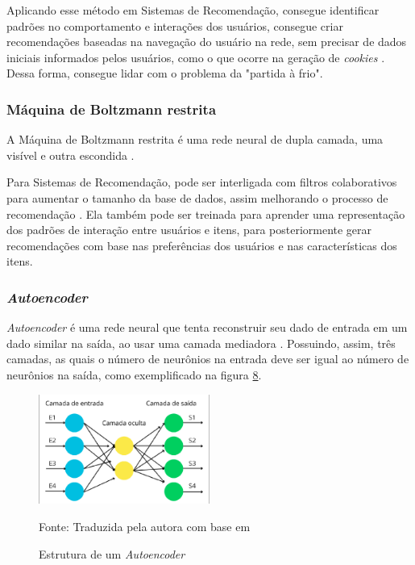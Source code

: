 Aplicando esse método em Sistemas de Recomendação, consegue identificar padrões no comportamento e interações dos usuários,
consegue criar recomendações baseadas na navegação do usuário na rede, sem precisar de dados iniciais informados pelos
usuários, como o que ocorre na geração de \textit{cookies} \cite{elSisi2020}. Dessa forma, consegue lidar com o problema 
da "partida à frio".

\subsubsection{Máquina de Boltzmann restrita}\label{subsubsec:boltzmann}
A Máquina de Boltzmann restrita é uma rede neural de dupla camada, uma visível e outra escondida \cite{elSisi2020}. 

Para Sistemas de Recomendação, pode ser interligada com filtros colaborativos para aumentar o tamanho da base de dados,
assim melhorando o processo de recomendação \cite{elSisi2020}. Ela também pode ser treinada para aprender uma representação
dos padrões de interação entre usuários e itens, para posteriormente gerar recomendações com base nas preferências dos
usuários e nas características dos itens.

\subsubsection{\textit{Autoencoder}}\label{subsubsec:autoencoder}
\textit{Autoencoder} é uma rede neural que tenta reconstruir seu dado de entrada em um dado similar na saída, ao usar uma
camada mediadora \cite{elSisi2020}. Possuindo, assim, três camadas, as quais o número de neurônios na entrada deve ser igual ao número de
neurônios na saída, como exemplificado na figura \hyperref[fig:autoencoder]{8}.
\begin{figure}[htbp]
    \centering
    \includegraphics[width=0.5\textwidth]{figuras/autoencoder2.eps}
    \caption{Estrutura de um \textit{Autoencoder}}
    \label{fig:autoencoder}
    \small Fonte: Traduzida pela autora com base em \cite{elSisi2020}
\end{figure}

